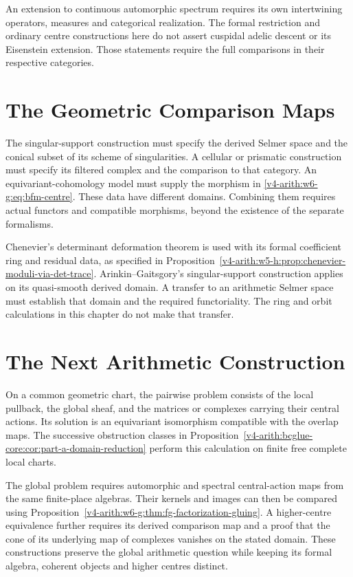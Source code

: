 \begin{remark}
\label{v4-arith:w6-g:rem:what-wave6-cannot-touch}
An extension to continuous automorphic spectrum requires its own
intertwining operators, measures and categorical realization.
The formal restriction and ordinary centre constructions here do
not assert cuspidal adelic descent or its Eisenstein extension.
Those statements require the full comparisons in their respective
categories.
\end{remark}

\section{The Geometric Comparison Maps}
\label{v4-arith:w6-g:data}
\label{v4-arith:w6-g:bibliography}

\begin{remark}
\label{v4-arith:w6-g:rem:data}
The singular-support construction must specify the derived Selmer
space and the conical subset of its scheme of singularities.
A cellular or prismatic construction must specify its filtered
complex and the comparison to that category.
An equivariant-cohomology model must supply the morphism in
\eqref{v4-arith:w6-g:eq:bfm-centre}.
These data have different domains. Combining them requires actual
functors and compatible morphisms, beyond the existence of the
separate formalisms.

Chenevier's determinant deformation theorem is used with its
formal coefficient ring and residual data, as specified in
Proposition~\ref{v4-arith:w5-h:prop:chenevier-moduli-via-det-trace}.
Arinkin--Gaitsgory's singular-support construction applies on its
quasi-smooth derived domain. A transfer to an arithmetic Selmer
space must establish that domain and the required functoriality.
The ring and orbit calculations in this chapter do not make that
transfer.
\end{remark}

\section{The Next Arithmetic Construction}
\label{v4-arith:w6-g:summary}

On a common geometric chart, the pairwise problem consists of
the local pullback, the global sheaf, and the matrices or complexes
carrying their central actions. Its solution is an equivariant
isomorphism compatible with the overlap maps. The successive obstruction classes in
Proposition~\ref{v4-arith:bcglue-core:cor:part-a-domain-reduction} perform
this calculation on finite free complete local charts.

The global problem requires automorphic and spectral central-action
maps from the same finite-place algebras. Their kernels and images
can then be compared using
Proposition~\ref{v4-arith:w6-g:thm:fg-factorization-gluing}.
A higher-centre equivalence further requires its derived comparison
map and a proof that the cone of its underlying map of complexes
vanishes on the stated domain.
These constructions preserve the global arithmetic question while
keeping its formal algebra, coherent objects and higher centres
distinct.
